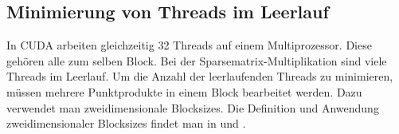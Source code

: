 \subsection{Minimierung von Threads im Leerlauf }

In CUDA  arbeiten gleichzeitig 32 Threads auf einem Multiprozessor.
Diese gehören alle zum selben Block.
Bei der Sparsematrix-Multiplikation sind viele Threads im Leerlauf.
Um die Anzahl der leerlaufenden Threads zu minimieren,
müssen mehrere Punktprodukte in einem Block bearbeitet werden.
Dazu verwendet man zweidimensionale Blocksizes.
Die Definition und Anwendung zweidimensionaler Blocksizes findet man in \cite{cudapg} und \cite{cudbp}.

